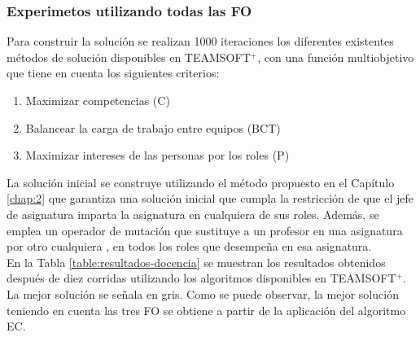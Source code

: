 \subsubsection{Experimetos utilizando todas las FO}

Para construir la solución se realizan 1000 iteraciones los diferentes existentes métodos de solución disponibles en TEAMSOFT$^+$, con una función multiobjetivo que tiene en cuenta los siguientes criterios:
\begin{enumerate}
	\setlength\itemsep{0em}
	\item Maximizar competencias (C)
	\item Balancear la carga de trabajo entre equipos (BCT)
	\item Maximizar intereses de las personas por los roles (P)
\end{enumerate}

La solución inicial se construye utilizando el método propuesto en el Capítulo \ref{chap:2} que garantiza una solución inicial que cumpla la restricción de que el jefe de asignatura imparta la asignatura en cualquiera de sus roles. Además, se emplea un operador de mutación que sustituye a un profesor en una asignatura por otro cualquiera , en todos los roles que desempeña en esa asignatura. \\

En la Tabla \ref{table:resultados-docencia} se muestran los resultados obtenidos después de diez corridas utilizando los algoritmos disponibles en TEAMSOFT$^+$. La mejor solución se señala en gris. Como se puede observar, la mejor solución teniendo en cuenta las tres FO se obtiene a partir de la aplicación del algoritmo EC.

